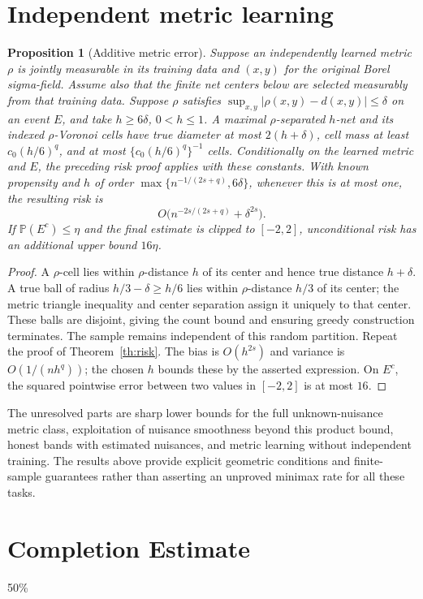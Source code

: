 \documentclass[11pt,a4paper]{article}
\newtheorem{proposition}[theorem]{Proposition}
\theoremstyle{definition}
\theoremstyle{remark}
\newcommand{\Prb}{\mathbb P}
\begin{document}
\section{Independent metric learning}
\begin{proposition}[Additive metric error]\label{pr:metric}
Suppose an independently learned metric $\rho$ is jointly measurable in its training data and $(x,y)$ for the original Borel sigma-field. Assume also that the finite net centers below are selected measurably from that training data. Suppose $\rho$ satisfies
$\sup_{x,y}|\rho(x,y)-d(x,y)|\leq\delta$ on an event $E$, and take $h\geq6\delta$, $0<h\leq1$. A maximal $\rho$-separated $h$-net and its indexed $\rho$-Voronoi cells have true diameter at most $2(h+\delta)$, cell mass at least $c_0(h/6)^q$, and at most $\{c_0(h/6)^q\}^{-1}$ cells. Conditionally on the learned metric and $E$, the preceding risk proof applies with these constants. With known propensity and $h$ of order $\max\{n^{-1/(2s+q)},6\delta\}$, whenever this is at most one, the resulting risk is
\[
 O\bigl(n^{-2s/(2s+q)}+\delta^{2s}\bigr).
\]
If $\Prb(E^c)\leq\eta$ and the final estimate is clipped to $[-2,2]$, unconditional risk has an additional upper bound $16\eta$.
\end{proposition}
\begin{proof}
A $\rho$-cell lies within $\rho$-distance $h$ of its center and hence true distance $h+\delta$. A true ball of radius $h/3-\delta\geq h/6$ lies within $\rho$-distance $h/3$ of its center; the metric triangle inequality and center separation assign it uniquely to that center. These balls are disjoint, giving the count bound and ensuring greedy construction terminates. The sample remains independent of this random partition. Repeat the proof of Theorem~\ref{th:risk}. The bias is $O(h^{2s})$ and variance is $O(1/(nh^q))$; the chosen $h$ bounds these by the asserted expression. On $E^c$, the squared pointwise error between two values in $[-2,2]$ is at most $16$.
\end{proof}

The unresolved parts are sharp lower bounds for the full unknown-nuisance metric class, exploitation of nuisance smoothness beyond this product bound, honest bands with estimated nuisances, and metric learning without independent training. The results above provide explicit geometric conditions and finite-sample guarantees rather than asserting an unproved minimax rate for all these tasks.

\section{Completion Estimate}
50\%
\end{document}
